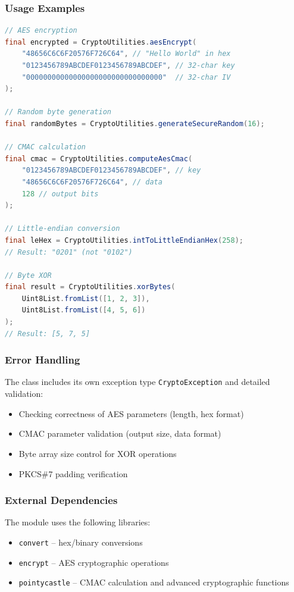 \documentclass[a4paper,12pt]{article}
\begin{document}
\subsubsection{Usage Examples}
\begin{lstlisting}[language=Java]
// AES encryption
final encrypted = CryptoUtilities.aesEncrypt(
    "48656C6C6F20576F726C64", // "Hello World" in hex
    "0123456789ABCDEF0123456789ABCDEF", // 32-char key
    "00000000000000000000000000000000"  // 32-char IV
);

// Random byte generation
final randomBytes = CryptoUtilities.generateSecureRandom(16);

// CMAC calculation
final cmac = CryptoUtilities.computeAesCmac(
    "0123456789ABCDEF0123456789ABCDEF", // key
    "48656C6C6F20576F726C64", // data
    128 // output bits
);

// Little-endian conversion
final leHex = CryptoUtilities.intToLittleEndianHex(258);
// Result: "0201" (not "0102")

// Byte XOR
final result = CryptoUtilities.xorBytes(
    Uint8List.fromList([1, 2, 3]),
    Uint8List.fromList([4, 5, 6])
);
// Result: [5, 7, 5]
\end{lstlisting}

\subsubsection{Error Handling}
The class includes its own exception type \texttt{CryptoException} and detailed validation:
\begin{itemize}
    \item Checking correctness of AES parameters (length, hex format)
    \item CMAC parameter validation (output size, data format)
    \item Byte array size control for XOR operations
    \item PKCS\#7 padding verification
\end{itemize}

\subsubsection{External Dependencies}
The module uses the following libraries:
\begin{itemize}
    \item \texttt{convert} -- hex/binary conversions
    \item \texttt{encrypt} -- AES cryptographic operations
    \item \texttt{pointycastle} -- CMAC calculation and advanced cryptographic functions
\end{itemize}
\end{document}

